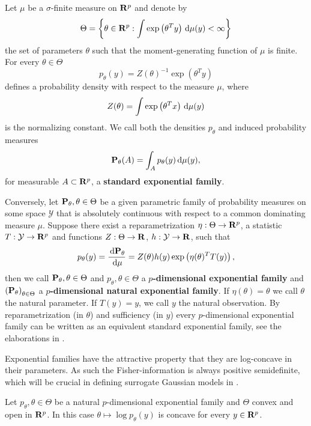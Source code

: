 \begin{definition}
    Let $\mu$ be a $\sigma$-finite measure on $\R^{p}$ and denote by 
    $$\Theta = \left\{\theta \in \R^{p} : \int \exp \left( \theta^{T} y \right) \d\mu(y) < \infty\right\}$$
    the set of parameters $\theta$ such that the moment-generating function of $\mu$ is finite. 
    For every $\theta \in \Theta$ $$p_{\theta}(y) = Z(\theta)^{-1} \exp (\theta^{T} y)$$ defines a probability density with respect to the measure $\mu$, where $$Z(\theta) = \int \exp \left( \theta^{T} x \right) \d\mu(y)$$ is the normalizing constant. 
    We call both the densities $p_{\theta}$ and induced probability measures $$ \P_{\theta} (A) = \int_{A} p_{\theta}(y) \d \mu(y),$$ for measurable $A \subset \R^{p}$, a \textbf{standard exponential family}.

    Conversely, let $\P_{\theta}, \theta \in \Theta$ be a given parametric family of probability measures on some space $\mathcal Y$ that is absolutely continuous with respect to a common dominating measure $\mu$. Suppose there exist a reparametrization $\eta : \Theta \to \R^{p}$, a statistic $T: \mathcal Y \to \R^{p}$ and functions $Z: \Theta\to \R$, $h:\mathcal Y \to \R$, such that
    $$
        p_{\theta}(y) = \frac{\d \P_{\theta}}{\d \mu} = Z(\theta) h(y) \exp \left(\eta(\theta)^{T}T(y)\right),
    $$
    then we call $\P_{\theta}, \theta \in \Theta$ and $p_{\theta}, \theta \in \Theta$ a \textbf{$p$-dimensional exponential family} and $\left(\P_{\theta}\right)_{\theta\in\Theta}$ a \textbf{$p$-dimensional natural exponential family}. If $\eta(\theta) = \theta$ we call $\theta$ the natural parameter. If $T(y) = y$, we call $y$ the natural observation. By reparametrization (in $\theta$) and sufficiency (in $y$) every $p$-dimensional exponential family can be written as an equivalent standard exponential family, see the elaborations in \citep[Chapter 1]{Brown1986Fundamentals}.
\end{definition}

Exponential families have the attractive property that they are log-concave in their parameters. As such the Fisher-information is always positive semidefinite, which will be crucial in defining surrogate Gaussian models in .
\begin{lemma}
    \label{lem:log-concavity}
    Let $p_{\theta}, \theta \in \Theta$ be a natural $p$-dimensional exponential family and $\Theta$ convex and open in $\R^{p}$. In this case $\theta \mapsto \log p_{\theta}(y)$ is concave for every $y \in \R^{p}$.
\end{lemma}

